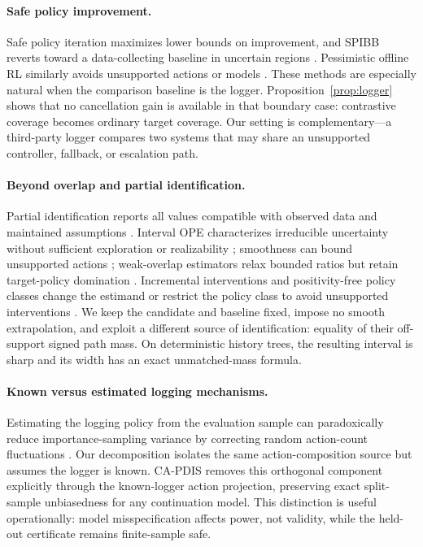 \paragraph{Safe policy improvement.}
Safe policy iteration maximizes lower bounds on improvement, and SPIBB reverts toward a data-collecting baseline in uncertain regions \citep{pirotta2013safe,laroche2019safe}. Pessimistic offline RL similarly avoids unsupported actions or models \citep{rashidinejad2021bridging,xie2021bellman,jin2022policy}. These methods are especially natural when the comparison baseline is the logger. Proposition~\ref{prop:logger} shows that no cancellation gain is available in that boundary case: contrastive coverage becomes ordinary target coverage. Our setting is complementary---a third-party logger compares two systems that may share an unsupported controller, fallback, or escalation path.

\paragraph{Beyond overlap and partial identification.}
Partial identification reports all values compatible with observed data and maintained assumptions \citep{manski2003partial}. Interval OPE characterizes irreducible uncertainty without sufficient exploration or realizability \citep{miyaguchi2023interval}; smoothness can bound unsupported actions \citep{khan2023beyond}; weak-overlap estimators relax bounded ratios but retain target-policy domination \citep{mehrabi2024weak}. Incremental interventions and positivity-free policy classes change the estimand or restrict the policy class to avoid unsupported interventions \citep{kennedy2019incremental,zhao2023positivity}. We keep the candidate and baseline fixed, impose no smooth extrapolation, and exploit a different source of identification: equality of their off-support signed path mass. On deterministic history trees, the resulting interval is sharp and its width has an exact unmatched-mass formula.

\paragraph{Known versus estimated logging mechanisms.}
Estimating the logging policy from the evaluation sample can paradoxically reduce importance-sampling variance by correcting random action-count fluctuations \citep{hanna2019importance,zhou2025demystifying}. Our decomposition isolates the same action-composition source but assumes the logger is known. CA-PDIS removes this orthogonal component explicitly through the known-logger action projection, preserving exact split-sample unbiasedness for any continuation model. This distinction is useful operationally: model misspecification affects power, not validity, while the held-out certificate remains finite-sample safe.

